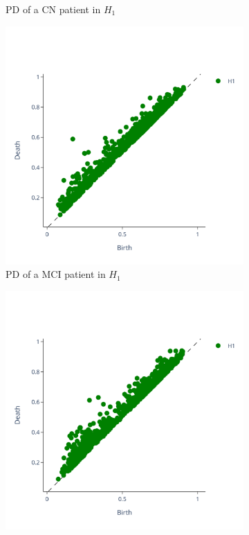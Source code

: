 \documentclass{article}
\begin{document}
\begin{figure}[htb]
\begin{subfigure}{0.32\textwidth}
    \caption{PD of a CN patient in $H_1$}
  \end{subfigure}
  \begin{subfigure}{0.32\textwidth}
    \includegraphics[width=\textwidth]{figures/PDs/persistence_diagram_MCI_H_1.png}
    \caption{PD of a MCI patient in $H_1$}
  \end{subfigure}
  \begin{subfigure}{0.32\textwidth}
    \includegraphics[width=\textwidth]{figures/PDs/persistence_diagram_AD_H_1.png}

\end{subfigure}
\end{figure}
\end{document}
